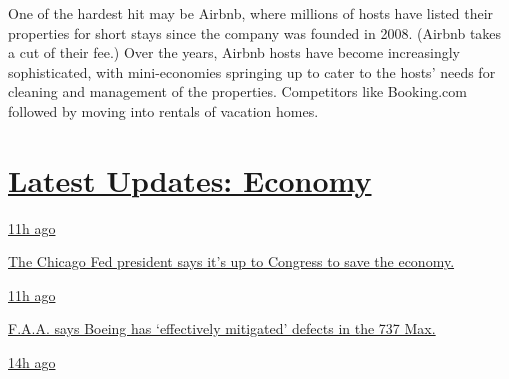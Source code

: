 One of the hardest hit may be Airbnb, where millions of hosts have
listed their properties for short stays since the company was founded in
2008. (Airbnb takes a cut of their fee.) Over the years, Airbnb hosts
have become increasingly sophisticated, with mini-economies springing up
to cater to the hosts' needs for cleaning and management of the
properties. Competitors like Booking.com followed by moving into rentals
of vacation homes.

\hypertarget{latest-updates-economy}{%
\section{\texorpdfstring{\href{https://www.nytimes3xbfgragh.onion/live/2020/08/03/business/stock-market-today-coronavirus?action=click\&pgtype=Article\&state=default\&region=MAIN_CONTENT_1\&context=storylines_live_updates}{Latest
Updates:
Economy}}{Latest Updates: Economy}}\label{latest-updates-economy}}

\href{https://www.nytimes3xbfgragh.onion/live/2020/08/03/business/stock-market-today-coronavirus?action=click\&pgtype=Article\&state=default\&region=MAIN_CONTENT_1\&context=storylines_live_updates\#the-chicago-fed-president-says-its-up-to-congress-to-save-the-economy}{11h
ago}

\href{https://www.nytimes3xbfgragh.onion/live/2020/08/03/business/stock-market-today-coronavirus?action=click\&pgtype=Article\&state=default\&region=MAIN_CONTENT_1\&context=storylines_live_updates\#the-chicago-fed-president-says-its-up-to-congress-to-save-the-economy}{The
Chicago Fed president says it's up to Congress to save the economy.}

\href{https://www.nytimes3xbfgragh.onion/live/2020/08/03/business/stock-market-today-coronavirus?action=click\&pgtype=Article\&state=default\&region=MAIN_CONTENT_1\&context=storylines_live_updates\#faa-says-boeing-has-effectively-mitigated-defects-in-the-737-max}{11h
ago}

\href{https://www.nytimes3xbfgragh.onion/live/2020/08/03/business/stock-market-today-coronavirus?action=click\&pgtype=Article\&state=default\&region=MAIN_CONTENT_1\&context=storylines_live_updates\#faa-says-boeing-has-effectively-mitigated-defects-in-the-737-max}{F.A.A.
says Boeing has `effectively mitigated' defects in the 737 Max.}

\href{https://www.nytimes3xbfgragh.onion/live/2020/08/03/business/stock-market-today-coronavirus?action=click\&pgtype=Article\&state=default\&region=MAIN_CONTENT_1\&context=storylines_live_updates\#small-businesses-got-emergency-loans-but-not-what-they-expected}{14h
ago}

